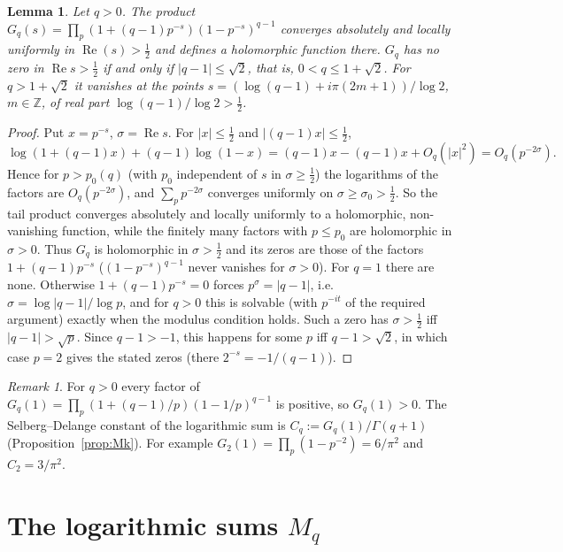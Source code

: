\documentclass[11pt]{amsart}
\newtheorem{lemma}[theorem]{Lemma}
\theoremstyle{definition}
\theoremstyle{remark}
\newtheorem{remark}[theorem]{Remark}
\renewcommand{\Re}{\operatorname{Re}}
\newcommand{\half}{\tfrac12}
\begin{document}
\begin{lemma}\label{lem:Gq}
  Let $q>0$.  The product $G_q(s)=\prod_p(1+(q-1)p^{-s})(1-p^{-s})^{q-1}$ converges
  absolutely and locally uniformly in $\Re(s)>\half$ and defines a holomorphic function
  there.  $G_q$ has no zero in $\Re s>\half$ if and only if $|q-1|\le\sqrt2$, that is,
  $0<q\le1+\sqrt2$.  For $q>1+\sqrt2$ it vanishes at the points
  $s=(\log(q-1)+i\pi(2m+1))/\log 2$, $m\in\mathbb Z$, of real part
  $\log(q-1)/\log2>\half$.
\end{lemma}
\begin{proof}
  Put $x=p^{-s}$, $\sigma=\Re s$.  For $|x|\le\half$ and $|(q-1)x|\le\half$,
  \[
    \log(1+(q-1)x)+(q-1)\log(1-x) = (q-1)x-(q-1)x+O_q(|x|^2)=O_q(p^{-2\sigma}).
  \]
  Hence for $p>p_0(q)$ (with $p_0$ independent of $s$ in $\sigma\ge\half$) the logarithms
  of the factors are $O_q(p^{-2\sigma})$, and $\sum_pp^{-2\sigma}$ converges uniformly on
  $\sigma\ge\sigma_0>\half$.  So the tail product converges absolutely and locally
  uniformly to a holomorphic, non-vanishing function, while the finitely many factors with
  $p\le p_0$ are holomorphic in $\sigma>0$.  Thus $G_q$ is holomorphic in $\sigma>\half$
  and its zeros are those of the factors $1+(q-1)p^{-s}$ ($(1-p^{-s})^{q-1}$ never
  vanishes for $\sigma>0$).  For $q=1$ there are none.  Otherwise $1+(q-1)p^{-s}=0$ forces
  $p^{\sigma}=|q-1|$, i.e.\ $\sigma=\log|q-1|/\log p$, and for $q>0$ this is solvable
  (with $p^{-it}$ of the required argument) exactly when the modulus condition holds.  Such
  a zero has $\sigma>\half$ iff $|q-1|>\sqrt p$.  Since $q-1>-1$, this happens for some $p$
  iff $q-1>\sqrt2$, in which case $p=2$ gives the stated zeros (there $2^{-s}=-1/(q-1)$).
\end{proof}

\begin{remark}
  For $q>0$ every factor of $G_q(1)=\prod_p(1+(q-1)/p)(1-1/p)^{q-1}$ is positive, so
  $G_q(1)>0$.  The Selberg--Delange constant of the logarithmic sum is
  $C_q := G_q(1)/\Gamma(q+1)$ (Proposition~\ref{prop:Mk}).  For example
  $G_2(1)=\prod_p(1-p^{-2})=6/\pi^2$ and $C_2=3/\pi^2$.
\end{remark}

\section{The logarithmic sums $M_q$}
\label{sec:Mk}
\end{document}
